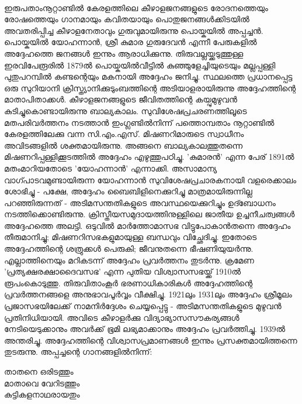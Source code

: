 \label{ch2box7} %
\begin{tcolorbox}[%
  breakable, %
  arc=0mm, 
  left=1pt, right = 1pt, 
  boxrule=0mm,
  colback = {blue!10}, %
] 

\paragraph{}

ഇരുപതാംനൂറ്റാണ്ടിൽ കേരളത്തിലെ കീഴാളജനങ്ങളുടെ രോദനത്തെയും രോഷത്തെയും ഗാനമായും കവിതയായും പൊതുജനങ്ങൾക്കിടയിൽ അവതരിപ്പിച്ച കീഴാളനേതാവും ഗുരുവുമായിരുന്നു പൊയ്കയിൽ അപ്പച്ചൻ. പൊയ്കയിൽ യോഹന്നാൻ, ശ്രീ കുമാര ഗുരുദേവൻ എന്നീ പേരുകളിൽ അദ്ദേഹത്തെ ജനങ്ങൾ ഇന്നും ആരാധിക്കുന്നു. തിരുവല്ലയ്ക്കടുത്തുള്ള ഇരവിപേരൂരിൽ 1879ൽ പൊയ്കയിൽവീട്ടിൽ കുഞ്ഞുളേച്ചിയുടെയും മല്ലപ്പള്ളി പുതുപറമ്പിൽ കണ്ടന്റെയും മകനായി അദ്ദേഹം ജനിച്ചു. സ്ഥലത്തെ പ്രധാനപ്പെട്ട ഒരു സുറിയാനി ക്രിസ്ത്യാനിക്കുടുംബത്തിന്റെ അടിയാളരായിരുന്നു അദ്ദേഹത്തിന്റെ മാതാപിതാക്കൾ. കീഴാളജനങ്ങളുടെ ജീവിതത്തിന്റെ കയ്പുമുഴുവൻ കുടിച്ചുകൊണ്ടായിരുന്നു ബാല്യകാലം. സുവിശേഷപ്രചരണത്തിലൂടെ മതപരിവർത്തനം നടത്താൻ ഇംഗ്ലണ്ടിൽനിന്ന് പത്തൊമ്പതാം നൂറ്റാണ്ടിൽ കേരളത്തിലേക്കു വന്ന സി.എം.എസ്. മിഷണറിമാരുടെ സ്വാധീനം അവിടങ്ങളിൽ ശക്തമായിരുന്നു. അങ്ങനെ ബാല്യകാലത്തുതന്നെ മിഷണറിപ്പള്ളിക്കൂടത്തിൽ അദ്ദേഹം എഴുത്തുപഠിച്ചു. 'കുമാരൻ' എന്ന പേര് 1891ൽ മതംമാറിയതോടെ 'യോഹന്നാൻ' എന്നാക്കി. അസാമാന്യ വാഗ്പാടവമുണ്ടായിരുന്ന യോഹന്നാൻ സുവിശേഷപ്രചാരകനായി വളരെക്കാലം ശോഭിച്ചു - പക്ഷേ, അദ്ദേഹം ബൈബിളിനെക്കുറിച്ചു മാത്രമായിരുന്നില്ല പറഞ്ഞിരുന്നത് - അടിമസന്തതികളുടെ അവസ്ഥയെക്കുറിച്ചും ഉദ്ബോധനം നടത്തിക്കൊണ്ടിരുന്നു. ക്രിസ്തീയസമുദായത്തിനുള്ളിലെ ജാതീയ ഉച്ചനീചത്വങ്ങൾ അദ്ദേഹത്തെ അലട്ടി. ഒടുവിൽ മാർത്തോമാസഭ വിട്ടുപോകാൻതന്നെ അദ്ദേഹം തീരുമാനിച്ചു; മിഷണറിസഭകളുമായുള്ള ബന്ധവും വിച്ഛേദിച്ചു. ഇതോടെ അദ്ദേഹത്തിന്റെ ശത്രുക്കൾ പെരുകി; ജീവനുതന്നെ ഭീഷണിയുയർന്നു. എല്ലാത്തിനെയും മറികടന്ന് അദ്ദേഹം പ്രവർത്തനം തുടർന്നു. ക്രമേണ 'പ്രത്യക്ഷരക്ഷാദൈവസഭ' എന്ന പുതിയ വിശ്വാസസഭയ്ക്ക് 1910ൽ രൂപംകൊടുത്തു. തിരുവിതാംകൂർ ഭരണാധികാരികൾ അദ്ദേഹത്തിന്റെ പ്രവർത്തനങ്ങളെ അനുഭാവപൂർവ്വം വീക്ഷിച്ചു. 1921ലും 1931ലും അദ്ദേഹം ശ്രീമൂലം പ്രജാസഭയിലേക്ക് നാമനിർദ്ദേശം ചെയ്യപ്പെട്ടു - അടിമസന്തതികളുടെ മുഴുവൻ പ്രതിനിധിയായി. അവിടെ കീഴാളർക്കു വിദ്യാഭ്യാസസൗകര്യങ്ങൾ നേടിയെടുക്കാനും അവർക്ക് ഭൂമി ലഭ്യമാക്കാനും അദ്ദേഹം പ്രവർത്തിച്ചു. 1939ൽ അന്തരിച്ചു. അദ്ദേഹത്തിന്റെ വിശ്വാസപ്രമാണങ്ങൾ ഇന്നും പ്രസക്തമായിത്തന്നെ തുടരുന്നു. അപ്പച്ചന്റെ ഗാനങ്ങളിൽനിന്ന്:
\begin{tcolorbox}{}
താതനെ ഒരിടത്തും\\
മാതാവെ വേറിടത്തും\\
കുട്ടികളനാഥരായതും\\

\end{tcolorbox}
\end{tcolorbox}
